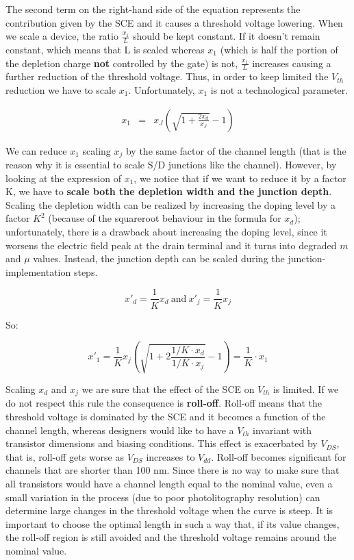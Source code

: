 \documentclass[a4paper, 12pt, twoside, openright]{report}
\begin{document}
{{{{The second term on the right-hand side of the equation represents the contribution given by the SCE and it causes a threshold voltage lowering. When we scale a device, the ratio $\frac{x_1}{L}$ should be kept constant. If it doesn't remain constant, which means that L is scaled whereas $x_{1}$ (which is half the portion of the depletion charge \textbf{not} controlled by the gate) is not, $\frac{x_1}{L}$ increases causing a further reduction of the threshold voltage. Thus, in order to keep limited the $V_{th}$ reduction we have to scale $x_{1}$. Unfortunately, $x_{1}$ is not a technological parameter.

	\begin{eqnarray*}
	   x_1&=& x_J \left(\sqrt{1+\frac{2x_d}{x_J}} -1 \right)
	\end{eqnarray*}

We can reduce $x_{1}$ scaling $x_{j}$ by the same factor of the channel length (that is the reason why it is essential to scale S/D junctions like the channel). However, by looking at the expression of $x_{1}$, we notice that if we want to reduce it by a factor K, we have to \textbf{scale both the depletion width and the junction depth}. Scaling the depletion width can be realized by increasing the doping level by a factor $K^2$ (because of the squareroot behaviour in the formula for $x_{d}$); unfortunately, there is a drawback about increasing the doping level, since it worsens the electric field peak at the drain terminal and it turns into degraded $m$ and $\mu$ values. Instead, the junction depth can be scaled during the junction-implementation steps.

	\begin{equation}
	x'_d = \frac{1}{K} x_d\ \text{and}\ x'_j = \frac{1}{K} x_j
	\end{equation}

So:

	\begin{equation}
	x'_1 = \frac{1}{K} x_j \left( \sqrt{1+ 2\frac{1/K \cdot x_d}{1/K \cdot x_j}} - 1 \right) = \frac{1}{K} \cdot x_1
	\end{equation}

Scaling $x_{d}$ and $x_{j}$ we are sure that the effect of the SCE on $V_{th}$ is limited. If we do not respect this rule the consequence is \textbf{roll-off}. Roll-off means that the threshold voltage is dominated by the SCE and it becomes a function of the channel length, whereas designers would like to have a $V_{th}$ invariant with transistor dimensions and biasing conditions. This effect is exacerbated by $V_{DS}$, that is, roll-off gets worse as $V_{DS}$ increases to $V_{dd}$. Roll-off becomes significant for channels that are shorter than 100 nm. Since there is no way to make sure that all transistors would have a channel length equal to the nominal value, even a small variation in the process (due to poor photolitography resolution) can determine large changes in the threshold voltage when the curve is steep. It is important to choose the optimal length in such a way that, if its value changes, the roll-off region is still avoided and the threshold voltage remains around the nominal value.

}}}}
\end{document}
